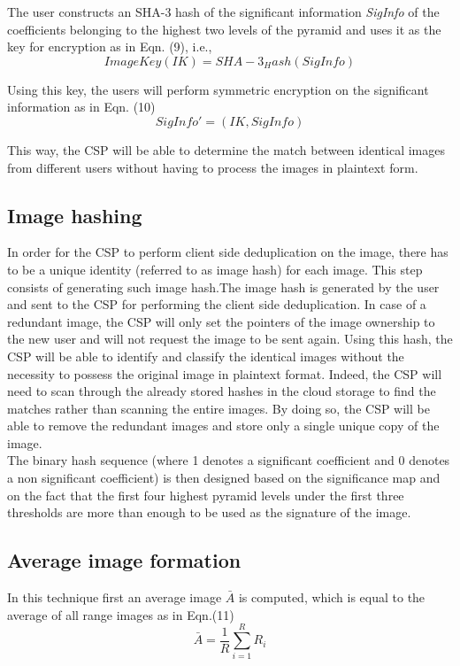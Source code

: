 \documentclass[10pt,a4paper,journal]{IEEEtran}
\begin{document}
 \hspace*{2em} The user constructs an SHA-3 hash of the significant information \textit{SigInfo} of the coefficients belonging to the highest two levels
of the pyramid and uses it as the key for encryption as in Eqn. (9)\cite{9}, i.e.,
\begin{equation}
ImageKey (IK) = SHA - 3_{H}ash(SigInfo)
\end{equation}

\hspace*{2em} Using this key, the users will perform symmetric encryption on the significant information as in Eqn. (10)\cite{9}
\begin{equation}
SigInfo' = (IK, SigInfo)
\end{equation}

This way, the CSP will be able to determine the match between identical images from different users without having to process the images in plaintext form.

\subsection{Image hashing}
\hspace*{2em} In order
for the CSP to perform client side deduplication on the image,
there has to be a unique identity (referred to as image hash)
for each image. This step consists of generating such image
hash.The image hash is generated by the user and sent to the
CSP for performing the client side deduplication. In case of a
redundant image, the CSP will only set the pointers of the image
ownership to the new user and will not request the image to
be sent again. Using this hash, the CSP will be able to identify
and classify the identical images without the necessity to
possess the original image in plaintext format. Indeed, the CSP
will need to scan through the already stored hashes in the cloud
storage to find the matches rather than scanning the entire
images. By doing so, the CSP will be
able to remove the redundant images and store only a single
unique copy of the image.\\
\hspace*{2em}  The binary hash sequence (where 1 denotes a significant coefficient and 0 denotes a non significant coefficient) is then designed based on the significance map and on the fact that the first four highest pyramid levels under the first three thresholds are more than enough to be used as the signature of the image. 
\subsection{Average image formation}
\hspace*{2em} In this technique\cite{12} first an average image $ \bar{A} $ is computed, which is equal to the average of all range images as in Eqn.(11)\cite{13}
\begin{equation}
\bar{A} = \frac{1}{R} \sum_{i=1}^{R} R_{i}
\end{equation}
\end{document}
